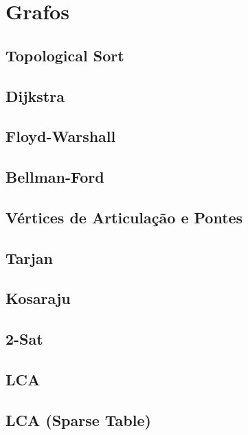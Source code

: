 \section{Grafos}
\subsection{Topological Sort}
\raggedbottom
\hrulefill
\subsection{Dijkstra}
\raggedbottom
\hrulefill
\subsection{Floyd-Warshall}
\raggedbottom
\hrulefill
\subsection{Bellman-Ford}
\raggedbottom
\hrulefill
\subsection{Vértices de Articulação e Pontes}
\raggedbottom
\hrulefill
\subsection{Tarjan}
\raggedbottom
\hrulefill
\subsection{Kosaraju}
\raggedbottom
\hrulefill
\subsection{2-Sat}
\raggedbottom
\hrulefill
\subsection{LCA}
\raggedbottom
\hrulefill
\subsection{LCA (Sparse Table)}
\raggedbottom
\hrulefill
